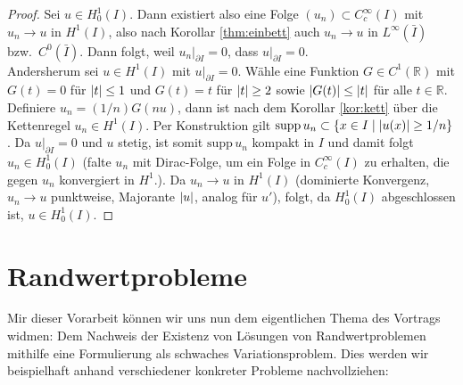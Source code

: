 \documentclass[twoside]{article}
\theoremstyle{definition}
\begin{document}
\begin{proof}
Sei $u \in H^1_0(I)$. Dann existiert also eine Folge $(u_n) \subset C_c^\infty(I)$ mit $u_n \to u$ in $H^1(I)$, also nach Korollar \ref{thm:einbett} auch $u_n \to u$ in $L^\infty(\bar{I})$ bzw.\ $C^0(\bar{I})$. Dann folgt, weil $u_n|_{\partial I} = 0$, dass $u|_{\partial I} = 0$.\\

Andersherum sei $u \in H^1(I)$ mit $u|_{\partial I} = 0$. Wähle eine Funktion $G \in C^1(\mathbb{R})$ mit $G(t) = 0$ für $\abs{t} \leq 1$ und $G(t) = t$ für $\abs{t} \geq 2$ sowie $\abs{G(t)} \leq \abs{t}$ für alle $t \in \mathbb{R}$. Definiere $u_n = (1/n)G(nu)$, dann ist nach dem Korollar \ref{kor:kett} über die Kettenregel $u_n \in H^1(I)$. Per Konstruktion gilt $\text{supp} \, u_n \subset \{x \in I \; | \; \abs{u(x)} \geq 1/n\}$. Da $u|_{\partial I} = 0$ und $u$ stetig, ist somit $\text{supp} \, u_n$ kompakt in $I$ und damit folgt $u_n \in H^1_0(I)$ (falte $u_n$ mit Dirac-Folge, um ein Folge in $C^\infty_c(I)$ zu erhalten, die gegen $u_n$ konvergiert in $H^1$.). Da $u_n \to u$ in $H^1(I)$ (dominierte Konvergenz, $u_n \to u$ punktweise, Majorante $\abs{u}$, analog für $u'$), folgt, da $H^1_0(I)$ abgeschlossen ist, $u \in H^1_0(I)$.
\end{proof}
\section{Randwertprobleme}
Mir dieser Vorarbeit können wir uns nun dem eigentlichen Thema des Vortrags widmen: Dem Nachweis der Existenz von Lösungen von Randwertproblemen mithilfe eine Formulierung als schwaches Variationsproblem. Dies werden wir beispielhaft anhand verschiedener konkreter Probleme nachvollziehen: 
\end{document}
